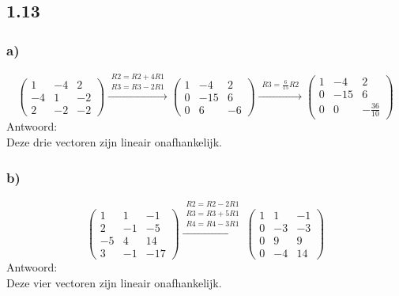 \documentclass[11pt]{article}
\begin{document}
\subsection*{1.13}
\subsubsection*{a)}
\[
\begin{pmatrix}
  1 & -4 & 2 \\
  -4 & 1 & -2 \\
  2 & -2 & -2 
 \end{pmatrix}
 \overset{\begin{matrix}
  R2 = R2+4R1 \\
  R3 = R3-2R1
 \end{matrix}}{\rightarrow}
 \begin{pmatrix}
  1 & -4 & 2 \\
  0 & -15 & 6 \\
  0 & 6 & -6 
 \end{pmatrix}
 \overset{\begin{matrix}
  R3 = \frac{6}{15}R2
 \end{matrix}}{\rightarrow}
 \begin{pmatrix}
  1 & -4 & 2 \\
  0 & -15 & 6 \\
  0 & 0 & -\frac{36}{10} 
 \end{pmatrix}
\]
Antwoord:\\
Deze drie vectoren zijn lineair onafhankelijk.

\subsubsection*{b)}
\[
 \begin{pmatrix}
  1 & 1 & -1 \\
  2 & -1 & -5 \\
  -5 & 4 & 14 \\
  3 & -1 & -17 
 \end{pmatrix}
 \overset{\begin{matrix}
  R2 = R2-2R1\\
  R3 = R3+5R1\\
  R4 = R4-3R1
 \end{matrix}}{\rightarrow}
 \begin{pmatrix}
  1 & 1 & -1 \\
  0 & -3 & -3 \\
  0 & 9 & 9 \\
  0 & -4 & 14 
 \end{pmatrix}
\]
Antwoord:\\
Deze vier vectoren zijn lineair onafhankelijk.
\end{document}
